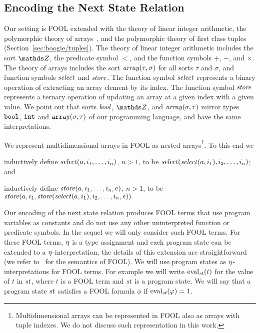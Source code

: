 \subsection{Encoding the Next State Relation}\label{sec:boogie/next-state/encoding}

Our setting is FOOL extended with the theory of linear integer arithmetic, the polymorphic theory of arrays~\cite{VampireAndFOOL}, and the polymorphic theory of first class tuples (Section~\ref{sec:boogie/tuples}). The theory of linear integer arithmetic includes the sort $\Z$, the predicate symbol $<$, and the function symbols $+$, $-$, and $\times$. The theory of arrays includes the sort $\mathit{array}(\tau,\sigma)$ for all sorts $\tau$ and $\sigma$, and function symbols $\mathit{select}$ and $\mathit{store}$. The function symbol $\mathit{select}$ represents a binary operation of extracting an array element by its index. The function symbol $\mathit{store}$ represents a ternary operation of updating an array at a given index with a given value. We point out that sorts $\mathit{bool}$, $\Z$, and $\mathit{array}(\sigma,\tau)$ mirror types $\mathtt{bool}$, $\mathtt{int}$ and $\mathtt{array}(\sigma,\tau)$ of our programming language, and have the same interpretations.

We represent multidimensional arrays in FOOL as nested arrays\footnote{Multidimensional arrays can be represented in FOOL also as arrays with tuple indexes. We do not discuss such representation in this work.}. To this end we
\begin{enumerate*}[label=(\roman*)]
  \item inductively define $\mathit{select}({a},\allowbreak{i_1,\allowbreak\ldots,\allowbreak i_n})$, $n > 1$, to be $\mathit{select}({\mathit{select}({a},\allowbreak{i_1})},\allowbreak{i_2,\ldots,i_n})$; and
  \item inductively define $\mathit{store}({a},\allowbreak{i_1,\allowbreak\ldots,\allowbreak i_n},\allowbreak{e})$, $n > 1$, to be $\mathit{store}({a},\allowbreak{i_1},\allowbreak{\mathit{store}({\mathit{select}({a},\allowbreak{i_1})},\allowbreak{i_2,\allowbreak\ldots,\allowbreak i_n},\allowbreak{e})}).$
\end{enumerate*}

Our encoding of the next state relation produces FOOL terms that use program variables as constants and do not use any other uninterpreted function or predicate symbols. In the sequel we will only consider such FOOL terms. For these FOOL terms, $\eta$ is a type assignment and each program state can be extended to a $\eta$-interpretation, the details of this extension are straightforward (we refer to~\cite{FOOL} for the semantics of FOOL). We will use program states as $\eta$-interpretations for FOOL terms. For example we will write $\mathrm{eval}_{\mathit{st}}({t})$ for the value of $t$ in $\mathit{st}$, where $t$ is a FOOL term and $\mathit{st}$ is a program state. We will say that a program state $\mathit{st}$ satisfies a FOOL formula $\phi$ if $\mathrm{eval}_{\mathit{st}}({\varphi}) = 1$.

